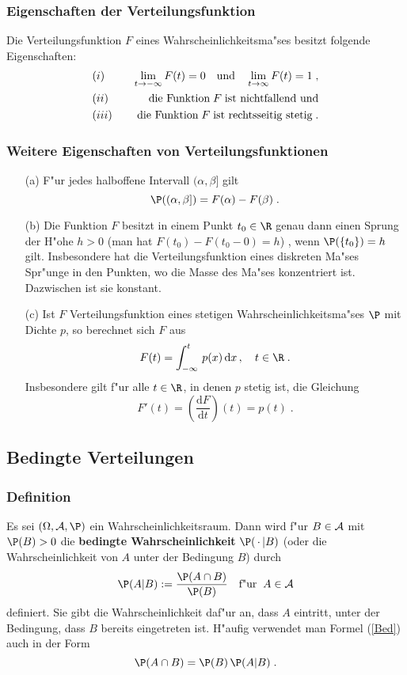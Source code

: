 \subsubsection{Eigenschaften der Verteilungsfunktion}
\begin{thm}
\label{VF}
Die Verteilungsfunktion $F$ eines Wahrscheinlichkeitsma"ses besitzt folgende Eigenschaften$\colon$
\begin{eqnarray*}
&(i)&\quad\lim_{t\to -\infty} F(t)=0\quad\mbox{\rm und}\quad\lim_{t\to\infty} F(t)=1\;,\\
&(ii)&\quad\mbox{\rm die Funktion}\; F\;\mbox{\rm ist nichtfallend und}\\
&(iii)&\quad\mbox{\rm die Funktion}\;
F\;\mbox{\rm ist rechtsseitig stetig}\;.
\end{eqnarray*}
\end{thm}
\subsubsection{Weitere Eigenschaften von Verteilungsfunktionen}
\begin{enumerate}
\item[(a)]
F"ur jedes halboffene Intervall $(\alpha,\beta]$ gilt
$$
\P((\alpha,\beta])= F(\alpha)-F(\beta)\;.
$$
\item[(b)]
Die Funktion $F$ besitzt in einem Punkt $t_0\in\R$ genau dann einen Sprung der H"ohe
$h>0$ (man hat $F(t_0)-F(t_0-0)=h$) , wenn $\P(\{t_0\})=h$ gilt. Insbesondere hat die
Verteilungsfunktion eines diskreten Ma"ses Spr"unge in den Punkten, wo die Masse
des Ma"ses konzentriert ist. Dazwischen ist sie konstant.
\item[(c)]
Ist $F$ Verteilungsfunktion eines stetigen Wahrscheinlichkeitsma"ses $\P$ mit Dichte $p$, so berechnet
sich $F$ aus
$$
F(t)=\int_{-\infty}^t\,p(x)\,\mathrm d x\,,\quad t\in\R\;.
$$
Insbesondere gilt f"ur alle $t\in\R$, in denen $p$ stetig ist, die Gleichung
$$
F'(t)=\left(\frac{\mathrm d F}{\mathrm d t} \right)(t)= p(t)\;.
$$
\end{enumerate}
\subsection{Bedingte Verteilungen}
\subsubsection{Definition}
Es sei $(\Omega,\fr A,\P)$ ein Wahrscheinlichkeitsraum. Dann wird
f"ur $B\in \mathcal A$ mit $\P(B)>0$ die \textbf{bedingte Wahrscheinlichkeit} $\P(\,\cdot\,|B)$
(oder die Wahrscheinlichkeit von $A$ unter der Bedingung $B$)
durch
\begin{equation}
\label{Bed}
 \P(A|B):=\frac{\P(A\cap B)}{\P(B)}\quad\mbox{f"ur}\;\;A\in\fr A
\end{equation}
definiert. Sie gibt die Wahrscheinlichkeit daf"ur an, dass $A$
eintritt, unter der Bedingung, dass $B$ bereits eingetreten ist. H"aufig verwendet man
Formel (\ref{Bed}) auch in der Form
$$
\P(A\cap B)= \P(B)\,\P(A|B)\;.
$$
